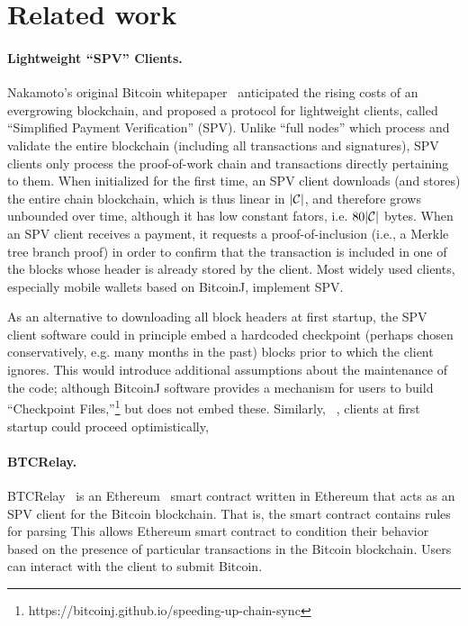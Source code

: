\section{Related work}


\paragraph{Lightweight ``SPV'' Clients.}
Nakamoto's original Bitcoin whitepaper~\cite{bitcoin} anticipated the rising costs of an evergrowing blockchain, and proposed a protocol for lightweight clients, called ``Simplified Payment Verification'' (SPV). Unlike ``full nodes'' which process and validate the entire blockchain (including all transactions and signatures), SPV clients only process the proof-of-work chain and transactions directly pertaining to them.
When initialized for the first time, an SPV client downloads (and stores) the entire chain blockchain, which is thus linear in $|\mathcal{C}|$, and therefore grows unbounded over time, although it has low constant fators, i.e.
$80|\mathcal{C}|$ bytes.
When an SPV client receives a payment, it requests a proof-of-inclusion (i.e., a Merkle tree branch proof) in order to confirm that the transaction is included in one of the blocks whose header is already stored by the client.
Most widely used clients, especially mobile wallets based on BitcoinJ, implement SPV.


As an alternative to downloading all block headers at first startup, the SPV client software could in principle embed a hardcoded checkpoint (perhaps chosen conservatively, e.g. many months in the past) blocks prior to which the client ignores. This would introduce additional assumptions about the maintenance of the code; although BitcoinJ software provides a mechanism for users to build ``Checkpoint Files,''\footnote{https://bitcoinj.github.io/speeding-up-chain-sync} but does not embed these. Similarly, ~\cite{betterspv}, clients at first startup could proceed optimistically,

\paragraph{BTCRelay.}
BTCRelay~\cite{btcrelay} is an Ethereum~\cite{ethereum} smart contract written in Ethereum that acts as an SPV client for the Bitcoin blockchain.
That is, the smart contract contains rules for parsing 
This allows Ethereum smart contract to condition their behavior based on the presence of particular transactions in the Bitcoin blockchain.
Users can interact with the client to submit Bitcoin.

